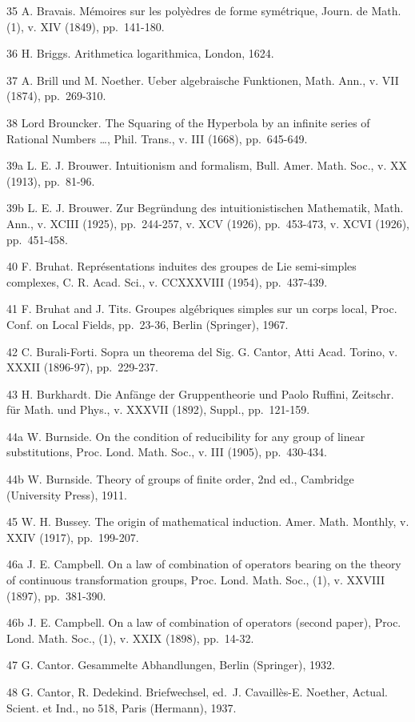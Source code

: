 35 A. Bravais. Mémoires sur les polyèdres de forme symétrique, Journ. de Math. (1), v. XIV (1849), pp.~141-180.

36 H. Briggs. Arithmetica logarithmica, London, 1624.

37 A. Brill und M. Noether. Ueber algebraische Funktionen, Math. Ann., v. VII (1874), pp.~269-310.

38 Lord Brouncker. The Squaring of the Hyperbola by an infinite series of Rational Numbers \ldots, Phil. Trans., v. III (1668), pp.~645-649.

39a L. E. J. Brouwer. Intuitionism and formalism, Bull. Amer. Math. Soc., v. XX (1913), pp.~81-96.

39b L. E. J. Brouwer. Zur Begründung des intuitionistischen Mathematik, Math. Ann., v. XCIII (1925), pp.~244-257, v. XCV (1926), pp.~453-473, v. XCVI (1926), pp.~451-458.

40 F. Bruhat. Représentations induites des groupes de Lie semi-simples complexes, C. R. Acad. Sci., v. CCXXXVIII (1954), pp.~437-439.

41 F. Bruhat and J. Tits. Groupes algébriques simples sur un corps local, Proc. Conf. on Local Fields, pp.~23-36, Berlin (Springer), 1967.

42 C. Burali-Forti. Sopra un theorema del Sig. G. Cantor, Atti Acad. Torino, v. XXXII (1896-97), pp.~229-237.

43 H. Burkhardt. Die Anfänge der Gruppentheorie und Paolo Ruffini, Zeitschr. für Math. und Phys., v. XXXVII (1892), Suppl., pp.~121-159.

44a W. Burnside. On the condition of reducibility for any group of linear substitutions, Proc. Lond. Math. Soc., v. III (1905), pp.~430-434.

44b W. Burnside. Theory of groups of finite order, 2nd ed., Cambridge (University Press), 1911.

45 W. H. Bussey. The origin of mathematical induction. Amer. Math. Monthly, v. XXIV (1917), pp.~199-207.

46a J. E. Campbell. On a law of combination of operators bearing on the theory of continuous transformation groups, Proc. Lond. Math. Soc., (1), v. XXVIII (1897), pp.~381-390.

46b J. E. Campbell. On a law of combination of operators (second paper), Proc. Lond. Math. Soc., (1), v. XXIX (1898), pp.~14-32.

47 G. Cantor. Gesammelte Abhandlungen, Berlin (Springer), 1932.

48 G. Cantor, R. Dedekind. Briefwechsel, ed.~J. Cavaillès-E. Noether, Actual. Scient. et Ind., no 518, Paris (Hermann), 1937.

